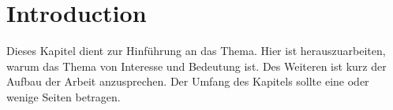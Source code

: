 
\chapter{Introduction}
\label{chap:intro}

Dieses Kapitel dient zur Hinführung an das Thema. Hier ist herauszuarbeiten, warum das
Thema von Interesse und Bedeutung ist. Des Weiteren ist kurz der Aufbau der Arbeit
anzusprechen. Der Umfang des Kapitels sollte eine oder wenige Seiten betragen.